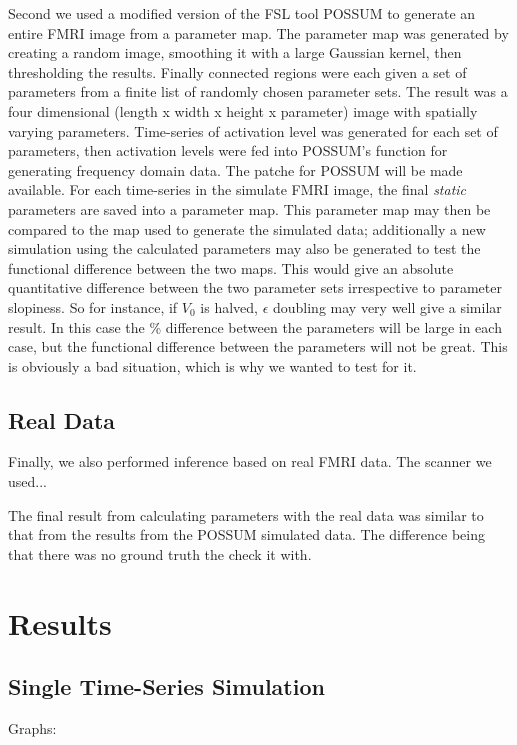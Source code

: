 \documentclass{article}
\begin{document}
Second we used a modified version of the FSL tool 
POSSUM to generate an entire FMRI image from a parameter map. The parameter map was generated
by creating a random image, smoothing it with a large Gaussian kernel, then thresholding
the results. Finally connected regions were each given a set of parameters from a finite
list of randomly chosen parameter sets. The result was a four dimensional (length x width
x height x parameter) image with spatially varying parameters. Time-series of activation level
was generated for each set of parameters, then activation levels were fed into POSSUM's 
function for generating frequency domain data. The patche for POSSUM will be made available.
For each time-series in the simulate FMRI image, the final \emph{static} parameters are saved
into a parameter map. This parameter map may then be compared to the map used to generate the 
simulated data; additionally a new simulation using the calculated parameters may also be 
generated to test the functional difference between the two maps. This would give an absolute 
quantitative difference between the two parameter sets irrespective to parameter slopiness.
So for instance, if $V_0$ is halved, $\epsilon$ doubling may very well give a similar result.
In this case the \% difference between the parameters will be large in each case, but the functional
difference between the parameters will not be great. This is obviously a bad situation, which
is why we wanted to test for it.

\subsection{Real Data}
Finally, we also performed inference based on real FMRI data. The scanner we used...

The final result from calculating parameters with the real data was similar to that
from the results from the POSSUM simulated data. The difference being that there was
no ground truth the check it with. 

\section{Results}
\subsection{Single Time-Series Simulation}

Graphs: 
\end{document}
